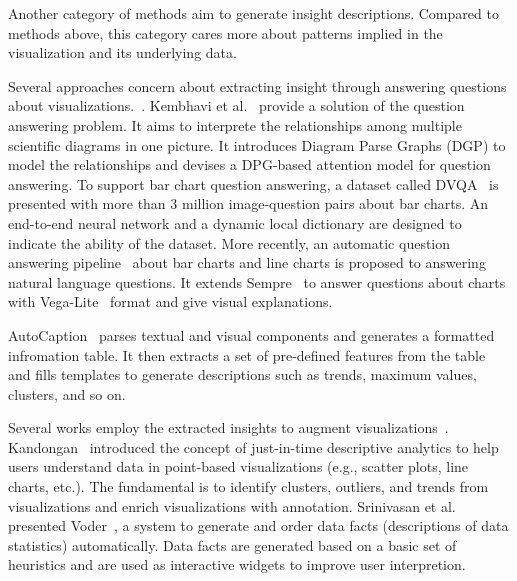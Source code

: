 Another category of methods aim to generate insight descriptions.
Compared to methods above, this category cares more about patterns implied in the visualization and its underlying data.

Several approaches concern about extracting insight through answering questions about visualizations.~\cite{DBLP:conf/cvpr/KaflePCK18, DBLP:conf/chi/KimHA20, DBLP:conf/eccv/KembhaviSKSHF16}.
Kembhavi et al.~\cite{DBLP:conf/eccv/KembhaviSKSHF16} provide a solution of the question answering problem. It aims to interprete the relationships among multiple scientific diagrams in one picture. It introduces Diagram Parse Graphs (DGP) to model the relationships and devises a DPG-based attention model for question answering.
To support bar chart question answering, a dataset called DVQA~\cite{DBLP:conf/cvpr/KaflePCK18} is presented with more than 3 million image-question pairs about bar charts. An end-to-end neural network and a dynamic local dictionary are designed to indicate the ability of the dataset.
More recently, an automatic question answering pipeline~\cite{DBLP:conf/chi/KimHA20} about bar charts and line charts is proposed to answering natural language questions. It extends Sempre~\cite{DBLP:conf/acl/PasupatL15, DBLP:conf/emnlp/ZhangPL17} to answer questions about charts with Vega-Lite~\cite{DBLP:journals/tvcg/SatyanarayanMWH17} format and give visual explanations.

AutoCaption~\cite{DBLP:conf/apvis/LiuXHWY20} parses textual and visual components and generates a formatted infromation table. It then extracts a set of pre-defined features from the table and fills templates to generate descriptions such as trends, maximum values, clusters, and so on.

Several works employ the extracted insights to augment visualizations~\cite{DBLP:conf/ieeevast/Kandogan12, DBLP:journals/tvcg/BryanMW17, DBLP:journals/tvcg/SrinivasanDES19}.
Kandongan~\cite{DBLP:conf/ieeevast/Kandogan12} introduced the concept of just-in-time descriptive analytics to help users understand data in point-based visualizations (e.g., scatter plots, line charts, etc.). 
The fundamental is to identify clusters, outliers, and trends from visualizations and enrich visualizations with annotation.
Srinivasan et al. presented Voder~\cite{DBLP:journals/tvcg/SrinivasanDES19}, a system to generate and order data facts (descriptions of data statistics) automatically. Data facts are generated based on a basic set of heuristics and are used as interactive widgets to improve user interpretion.

